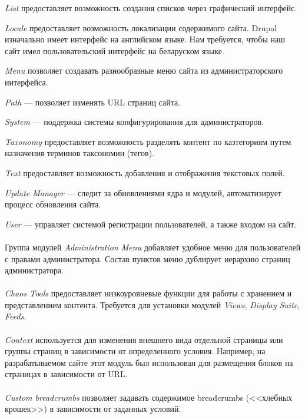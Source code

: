 \textit{List} предоставляет возможность создания списков через графический интерфейс.

\textit{Locale} предоставляет возможность локализации содержимого сайта.
Drupal изначально имеет интерфейс на английском языке. 
Нам требуется, чтобы наш сайт имел пользовательский интерфейс на беларуском языке.

\textit{Menu} позволяет создавать разнообразные меню сайта из администраторского интерфейса.

\textit{Path} --- позволяет изменять URL страниц сайта.

\textit{System} --- поддержка системы конфигурирования для администраторов.

\textit{Taxonomy} предоставляет возможность разделять контент по казтегориям 
путем назначения терминов таксономии (тегов).

\textit{Text} предоставляет возможность добавления и отображения текстовых полей.

\textit{Update Manager} --- следит за обновлениями ядра и модулей,
автоматизирует процесс обновления сайта.

\textit{User} --- управляет системой регистрации пользователей, а также входом на сайт.

\paragraph{}
Группа модулей \textit{Administration Menu} добавляет удобное меню для пользователей 
с правами администратора. Состав пунктов меню дублирует иерархию страниц администратора.

\paragraph{}
\textit{Chaos Tools} предоставляет низкоуровневые функции для работы с хранением и 
представлением контента. Требуется для установки модулей \textit{Views},
\textit{Display Suite}, \textit{Feeds}.

\paragraph{}
\textit{Context} используется для изменения внешнего вида отдельной страницы или 
группы страниц в зависимости от определенного условия.
Например, на разрабатываемом сайте этот модуль был использован для размещения блоков
на страницах в зависимости от URL.
  
\paragraph{}
\textit{Custom breadcrumbs} позволяет задавать содержимое breadcrumbs (<<хлебных крошек>>) 
в зависимости от заданных условий.

